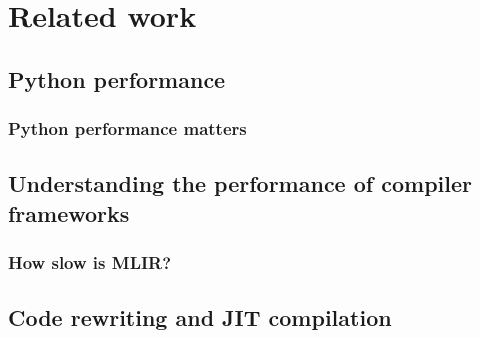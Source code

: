 \chapter{Related work}

%
%

\section{Python performance}
\label{sec:python-performance}

\subsection{Python performance matters}
\label{ssec:python-performance-matters}

\section{Understanding the performance of compiler frameworks}
\label{sec:understanding-framework-performance}

\subsection{How slow is MLIR?}
\label{ssec:how-slow-is-mlir}

\section{Code rewriting and JIT compilation}
\label{sec:code-rewriting-jit}